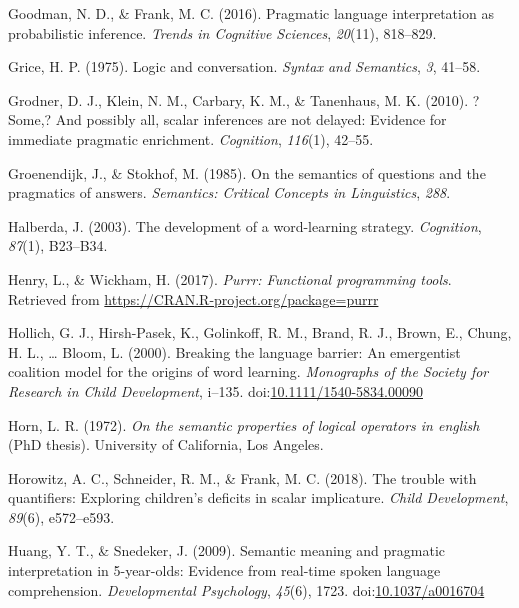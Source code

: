 \documentclass[mask,man]{apa6}
\begin{document}
\hypertarget{ref-goodman2016}{}
Goodman, N. D., \& Frank, M. C. (2016). Pragmatic language
interpretation as probabilistic inference. \emph{Trends in Cognitive
Sciences}, \emph{20}(11), 818--829.

\hypertarget{ref-grice1975logic}{}
Grice, H. P. (1975). Logic and conversation. \emph{Syntax and
Semantics}, \emph{3}, 41--58.

\hypertarget{ref-grodner2010}{}
Grodner, D. J., Klein, N. M., Carbary, K. M., \& Tanenhaus, M. K.
(2010). ?Some,? And possibly all, scalar inferences are not delayed:
Evidence for immediate pragmatic enrichment. \emph{Cognition},
\emph{116}(1), 42--55.

\hypertarget{ref-groenendijk1985semantics}{}
Groenendijk, J., \& Stokhof, M. (1985). On the semantics of questions
and the pragmatics of answers. \emph{Semantics: Critical Concepts in
Linguistics}, \emph{288}.

\hypertarget{ref-halberda2003development}{}
Halberda, J. (2003). The development of a word-learning strategy.
\emph{Cognition}, \emph{87}(1), B23--B34.

\hypertarget{ref-R-purrr}{}
Henry, L., \& Wickham, H. (2017). \emph{Purrr: Functional programming
tools}. Retrieved from \url{https://CRAN.R-project.org/package=purrr}

\hypertarget{ref-hollich2000}{}
Hollich, G. J., Hirsh-Pasek, K., Golinkoff, R. M., Brand, R. J., Brown,
E., Chung, H. L., \ldots{} Bloom, L. (2000). Breaking the language
barrier: An emergentist coalition model for the origins of word
learning. \emph{Monographs of the Society for Research in Child
Development}, i--135.
doi:\href{https://doi.org/10.1111/1540-5834.00090}{10.1111/1540-5834.00090}

\hypertarget{ref-horn1972}{}
Horn, L. R. (1972). \emph{On the semantic properties of logical
operators in english} (PhD thesis). University of California, Los
Angeles.

\hypertarget{ref-horowitz2018}{}
Horowitz, A. C., Schneider, R. M., \& Frank, M. C. (2018). The trouble
with quantifiers: Exploring children's deficits in scalar implicature.
\emph{Child Development}, \emph{89}(6), e572--e593.

\hypertarget{ref-huang2009b}{}
Huang, Y. T., \& Snedeker, J. (2009). Semantic meaning and pragmatic
interpretation in 5-year-olds: Evidence from real-time spoken language
comprehension. \emph{Developmental Psychology}, \emph{45}(6), 1723.
doi:\href{https://doi.org/10.1037/a0016704}{10.1037/a0016704}
\end{document}
